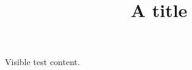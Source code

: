 \documentclass[paper=A4]{ropas-poster}
\title{A title}
\begin{document}
Visible test content.
\end{document}
